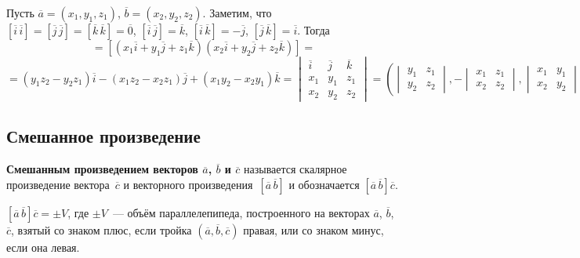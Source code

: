 Пусть $\overline a = (x_1, y_1, z_1)$, $\overline b = (x_2, y_2, z_2)$.
Заметим, что $[\overline i\,\overline i] = [\overline j\,\overline j] = [\overline k\,\overline k] = \overline 0$, $[\overline i\,\overline j] = \overline k$, $[\overline i\,\overline k] = -\overline j$, $[\overline j\,\overline k] = \overline i$.
Тогда
\begin{equation*}
[\overline a\,\overline b] =
[(x_1 \overline i + y_1 \overline j + z_1 \overline k)(x_2 \overline i + y_2 \overline j + z_2 \overline k)] =
\end{equation*}
\begin{equation*}
= (y_1 z_2 - y_2 z_1) \overline i - (x_1 z_2 - x_2 z_1) \overline j + (x_1 y_2 - x_2 y_1) \overline k =
\begin{vmatrix}
\overline i & \overline j & \overline k \\
x_1 & y_1 & z_1 \\
x_2 & y_2 & z_2
\end{vmatrix} =
\left(
\begin{vmatrix}
y_1 & z_1 \\
y_2 & z_2
\end{vmatrix},
-\begin{vmatrix}
x_1 & z_1 \\
x_2 & z_2
\end{vmatrix},
\begin{vmatrix}
x_1 & y_1 \\
x_2 & y_2
\end{vmatrix}
\right)
\end{equation*}

\subsection{Смешанное произведение}
 \textbf{Смешанным произведением векторов $\overline a$, $\overline b$ и $\overline c$} называется скалярное произведение вектора~$\overline c$ и векторного произведения~$[\overline a\,\overline b]$ и обозначается $[\overline a\,\overline b] \overline c$.

\begin{statement}
$[\overline a\,\overline b] \overline c = \pm V$, где $\pm V$~--- объём параллелепипеда, построенного на векторах $\overline a$, $\overline b$, $\overline c$, взятый со знаком плюс, если тройка $(\overline a, \overline b, \overline c)$ правая, или со знаком минус, если она левая.
\end{statement}

